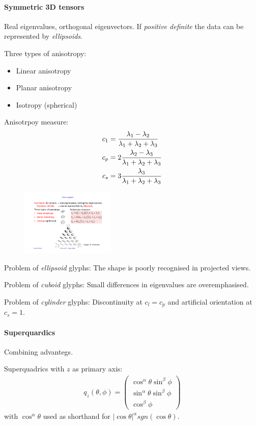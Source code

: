 \paragraph{Symmetric 3D tensors}  Real eigenvalues, orthogonal eigenvectors. If \emph{positive definite} the data can be represented by \emph{ellipsoids}.

Three types of anisotropy:
    \begin{itemize}
        \item Linear anisotropy
        \item Planar anisotropy
        \item Isotropy (spherical)
    \end{itemize}
    
Anisotrpoy measure:
\begin{align*}
    c_1 &= {\lambda_1-\lambda_2 \over \lambda_1+\lambda_2+\lambda_3}\\
    c_p &= 2{\lambda_2-\lambda_3 \over \lambda_1+\lambda_2+\lambda_3}\\
    c_s &= 3{\lambda_3 \over \lambda_1+\lambda_2+\lambda_3}
\end{align*}

\begin{figure}[H]
\centering
\includegraphics[width=0.4\textwidth]{img/10_3d_tensors}
\end{figure}

Problem of \emph{ellipsoid} glyphs:
The shape is poorly recognised in projected views.

Problem of \emph{cuboid} glyphs: Small differences in eigenvalues are overemphasised.

Problem of \emph{cylinder} glyphs: Discontinuity at $c_l = c_p$ and artificial orientation at $c_s =1$.

\paragraph{Superquardics} Combining advantegs.

Superquadrics with $z$ as primary axis:
\begin{align*}
    q_z (\theta,\phi) = \begin{pmatrix}
                             \cos^{\alpha} \theta \sin^{\beta}\phi\\
                             \sin^{\alpha} \theta \sin^{\beta}\phi\\
                             \cos^{\beta} \phi
                        \end{pmatrix}
\end{align*}
with $\cos^{\alpha}\theta$ used as shorthand for $|\cos\theta|^\alpha sgn(\cos\theta)$.

